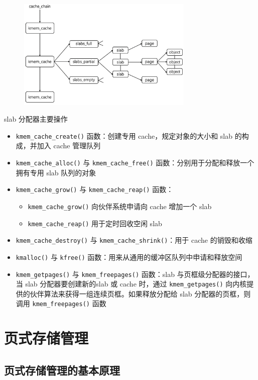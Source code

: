\documentclass[cs4size,a4paper,10pt]{ctexart}
\begin{document}
		\begin{figure}[H]
			\centering
			\includegraphics[width=0.75\textwidth]{img/3.2.4.3}
		\end{figure}
		slab 分配器主要操作
		\begin{itemize}
			\item \verb|kmem_cache_create()| 函数：创建专用 cache，规定对象的大小和 slab 的构成，并加入 cache 管理队列
			\item \verb|kmem_cache_alloc()| 与 \verb|kmem_cache_free()| 函数：分别用于分配和释放一个拥有专用 slab 队列的对象
			\item \verb|kmem_cache_grow()| 与 \verb|kmem_cache_reap()| 函数：
			\begin{itemize}
				\item \verb|kmem_cache_grow()| 向伙伴系统申请向 cache 增加一个 slab
				\item \verb|kmem_cache_reap()| 用于定时回收空闲 slab
			\end{itemize}
			\item \verb|kmem_cache_destroy()| 与 \verb|kmem_cache_shrink()|：用于 cache 的销毁和收缩
			\item \verb|kmalloc()| 与 \verb|kfree()| 函数：用来从通用的缓冲区队列中申请和释放空间
			\item \verb|kmem_getpages()| 与 \verb|kmem_freepages()| 函数：slab 与页框级分配器的接口，当 slab 分配器要创建新的slab 或 cache 时，通过 \verb|kmem_getpages()| 向内核提供的伙伴算法来获得一组连续页框。如果释放分配给 slab 分配器的页框，则调用 \verb|kmem_freepages()| 函数
		\end{itemize}


		\section{页式存储管理}
		\subsection{页式存储管理的基本原理}
\end{document}
